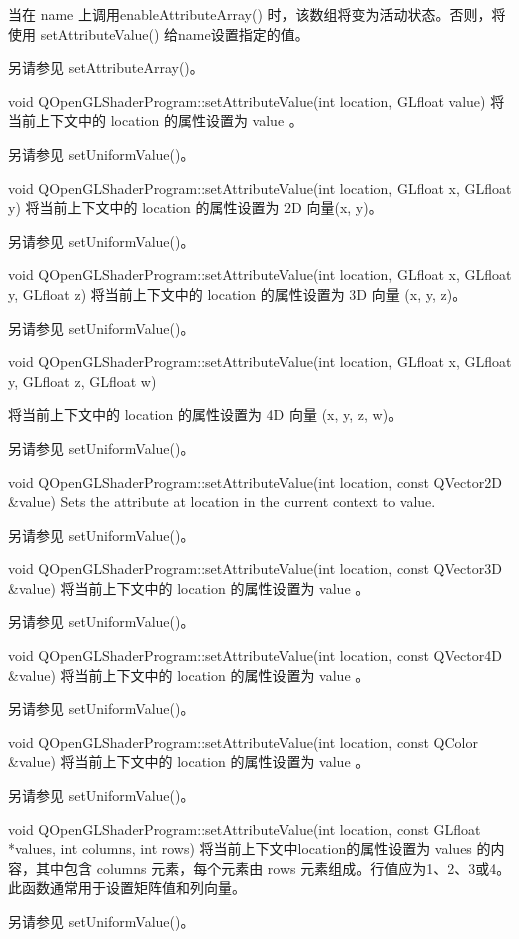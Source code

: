 当在 name 上调用enableAttributeArray() 时，该数组将变为活动状态。否则，将使用 setAttributeValue() 给name设置指定的值。

另请参见 setAttributeArray()。

void QOpenGLShaderProgram::setAttributeValue(int location, GLfloat value)
将当前上下文中的 location 的属性设置为 value 。

另请参见 setUniformValue()。

void QOpenGLShaderProgram::setAttributeValue(int location, GLfloat x, GLfloat y)
将当前上下文中的 location 的属性设置为 2D 向量(x, y)。

另请参见 setUniformValue()。

void QOpenGLShaderProgram::setAttributeValue(int location, GLfloat x, GLfloat y, GLfloat z)
将当前上下文中的 location 的属性设置为 3D 向量 (x, y, z)。

另请参见 setUniformValue()。

void QOpenGLShaderProgram::setAttributeValue(int location, GLfloat x, GLfloat y, GLfloat z, GLfloat w)

将当前上下文中的 location 的属性设置为 4D 向量 (x, y, z, w)。

另请参见 setUniformValue()。

void QOpenGLShaderProgram::setAttributeValue(int location, const QVector2D \&value)
Sets the attribute at location in the current context to value.

另请参见 setUniformValue()。

void QOpenGLShaderProgram::setAttributeValue(int location, const QVector3D \&value)
将当前上下文中的 location 的属性设置为 value 。

另请参见 setUniformValue()。

void QOpenGLShaderProgram::setAttributeValue(int location, const QVector4D \&value)
将当前上下文中的 location 的属性设置为 value 。

另请参见 setUniformValue()。

void QOpenGLShaderProgram::setAttributeValue(int location, const QColor \&value)
将当前上下文中的 location 的属性设置为 value 。

另请参见 setUniformValue()。

void QOpenGLShaderProgram::setAttributeValue(int location, const GLfloat *values, int columns, int rows)
将当前上下文中location的属性设置为 values 的内容，其中包含 columns 元素，每个元素由 rows 元素组成。行值应为1、2、3或4。此函数通常用于设置矩阵值和列向量。

另请参见 setUniformValue()。

